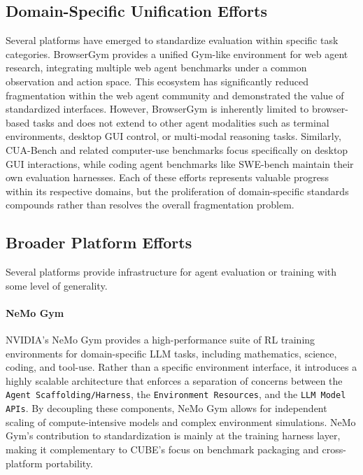 \documentclass{article}
\theoremstyle{plain}
\theoremstyle{definition}
\theoremstyle{remark}
\begin{document}
\subsection{Domain-Specific Unification Efforts}

Several platforms have emerged to standardize evaluation within specific task categories. BrowserGym \citep{ chezelles2025browsergym} provides a unified Gym-like environment for web agent research, integrating multiple web agent benchmarks under a common observation and action space. This ecosystem has significantly reduced fragmentation within the web agent community and demonstrated the value of standardized interfaces. However, BrowserGym is inherently limited to browser-based tasks and does not extend to other agent modalities such as terminal environments, desktop GUI control, or multi-modal reasoning tasks. Similarly, CUA-Bench \citep{cuabench2025} and related computer-use benchmarks focus specifically on desktop GUI interactions, while coding agent benchmarks like SWE-bench \citep{jimenez2023swebench} maintain their own evaluation harnesses. Each of these efforts represents valuable progress within its respective domains, but the proliferation of domain-specific standards compounds rather than resolves the overall fragmentation problem.
\subsection{Broader Platform Efforts}

Several platforms provide infrastructure for agent evaluation or training with some level of generality.

\paragraph{NeMo Gym} NVIDIA's NeMo Gym \citep{nemo-gym} provides a high-performance suite of RL training environments for domain-specific LLM tasks, including mathematics, science, coding, and tool-use. Rather than a specific environment interface, it introduces a highly scalable architecture that enforces a separation of concerns between the \texttt{Agent Scaffolding/Harness}, the \texttt{Environment Resources}, and the \texttt{LLM Model APIs}. By decoupling these components, NeMo Gym allows for independent scaling of compute-intensive models and complex environment simulations. NeMo Gym's contribution to standardization is mainly at the training harness layer, making it complementary to CUBE's focus on benchmark packaging and cross-platform portability.
\end{document}
